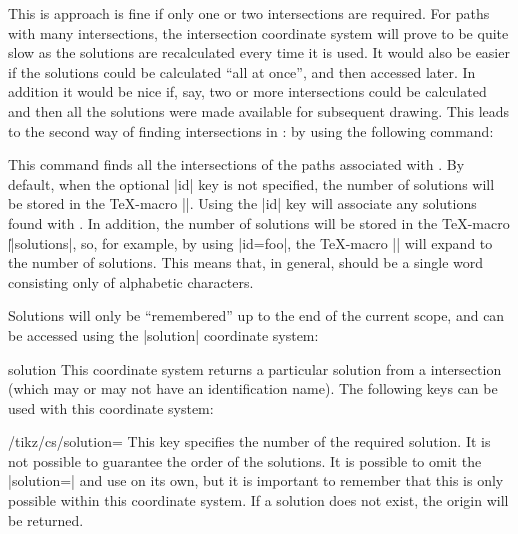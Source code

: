   This is approach is fine if only one or two intersections are 
  required. For paths with many intersections, the intersection
  coordinate system will prove to be quite slow as the solutions 
  are recalculated every time it is used. It would also be
  easier if the solutions could be calculated ``all at once'', and
  then accessed later. In addition it would be nice if, say, two or
  more intersections could be calculated and then all the solutions
  were made available for subsequent drawing. This leads to the
  second way of finding intersections in \tikzname: by using the
  following command:

\begin{command}{\tikzintersectnamedpaths\opt{|[id=|\meta{name}|]|}}
  
  This command finds all the intersections of the paths associated 
  with  . 
  By default, when the optional |id| key is not 
  specified, the number of solutions will be stored in the \TeX-macro 
  |\solutions|. Using the |id| key will associate any solutions
  found with . In addition, the number of solutions will 
  be stored in the \TeX-macro |\||solutions|, so, for 
  example, by using |id=foo|, the \TeX-macro |\foosolutions|  will 
  expand to the number of solutions. This means that, in general, 
   should be a single word consisting only of alphabetic 
  characters.
  
  Solutions will only be ``remembered'' up to the end of the current
  scope, and can be accessed using the |solution| coordinate system:
    
\begin{coordinatesystem}{solution}
  This coordinate system returns a particular solution from 
  a intersection (which may or may not have an identification 
  name). The following keys can be used with this coordinate
  system:

\begin{key}{/tikz/cs/solution=}
  This key specifies the number of the required solution. It is not
  possible to guarantee the order of the solutions. It is possible
  to omit the |solution=| and use  on its own, but it
  is important to remember that this is only possible within this
  coordinate system. If a solution does not exist, the origin will be
  returned.

\begin{codeexample}[]
\end{codeexample}
\end{key}


\end{coordinatesystem}
\end{command}
